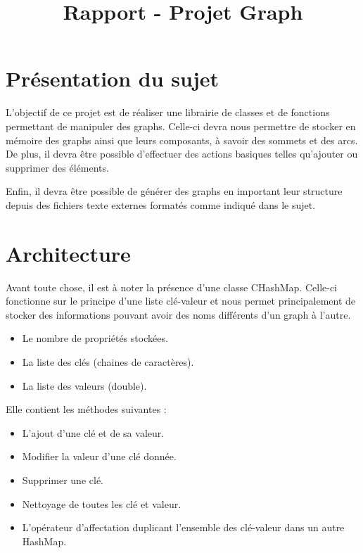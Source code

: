 
\title{Rapport - Projet Graph}
\fancyhf{}
\lhead{\leftmark}


	\maketitle
	\tableofcontents
	\chapter{Présentation du sujet}
		L'objectif de ce projet est de réaliser une librairie de classes et de fonctions permettant de manipuler des graphs. Celle-ci devra nous permettre de stocker en mémoire des graphs ainsi que leurs composants, à savoir des sommets et des arcs. De plus, il devra être possible d'effectuer des actions basiques telles qu'ajouter ou supprimer des éléments.
		
		Enfin, il devra être possible de générer des graphs en important leur structure depuis des fichiers texte externes formatés comme indiqué dans le sujet.
	
	\chapter{Architecture}
		Avant toute chose, il est à noter la présence d'une classe CHashMap. Celle-ci fonctionne sur le principe d'une liste clé-valeur et nous permet principalement de stocker des informations pouvant avoir des noms différents d'un graph à l'autre.
		
		\begin{itemize}
			\item Le nombre de propriétés stockées.
			\item La liste des clés (chaines de caractères).
			\item La liste des valeurs (double).
		\end{itemize}
		
		Elle contient les méthodes suivantes :
		\begin{itemize}
			\item L'ajout d'une clé et de sa valeur.
			\item Modifier la valeur d'une clé donnée.
			\item Supprimer une clé.
			\item Nettoyage de toutes les clé et valeur.
			\item L'opérateur d'affectation duplicant l'ensemble des clé-valeur dans un autre HashMap.\\
		\end{itemize}
	
